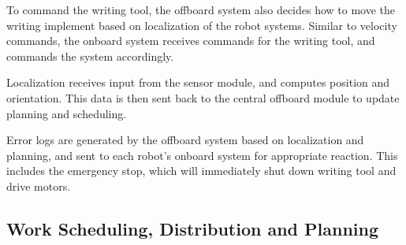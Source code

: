 To command the writing tool, the offboard system also decides how to move the writing implement based on localization of the robot systems. Similar to velocity commands, the onboard system receives commands for the writing tool, and commands the system accordingly.

Localization receives input from the sensor module, and computes position and orientation. This data is then sent back to the central offboard module to update planning and scheduling.

Error logs are generated by the offboard system based on localization and planning, and sent to each robot's onboard system for appropriate reaction. This includes the emergency stop, which will immediately shut down writing tool and drive motors.

\subsection{Work Scheduling, Distribution and Planning}
\label{sec:sw_arch_planner}
